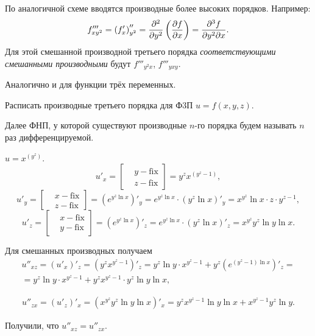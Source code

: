 \documentclass[../../main.tex]{subfiles}
\begin{document}
	По аналогичной схеме вводятся производные более высоких порядков. 
	Например:
	\[f'''_{xy^2} = \left(f'_x\right)''_{y^2} =
	 \frac{\partial ^2}{\partial y^2}\left(\frac{\partial f}{\partial x}\right) = 
	 \frac{\partial ^3f}{\partial y^2\partial x}.\]
	Для этой смешанной производной третьего порядка 
	\emph{соответствующими смешанными производными} будут $f'''_{y^2x}$, 
	$f'''_{yxy}$.
	
	Аналогично и для функции трёх переменных.
	
	\begin{exc}
		Расписать производные третьего порядка для Ф3П $u=f(x,y,z)$.
	\end{exc}

	Далее ФНП, у которой существуют производные $n$-го порядка будем 
	называть $n$ раз дифференцируемой.
	
	\begin{exmp}
		$u = x^{\left(y^z\right)}$.
		\[u'_x = \left[\begin{aligned}
			& y - \text{fix}\\
			& z - \text{fix}
		\end{aligned}\right] = y^zx^{\left(y^z - 1\right)},\]
		\[u'_y = \left[\begin{aligned}
			& x - \text{fix}\\
			& z - \text{fix}
		\end{aligned}\right] = \left(e^{y^z\ln x}\right)'_y = 
		e^{y^z\ln x}\cdot\left(y^z\ln x\right)'_y = x^{y^z}\ln x\cdot 
		z\cdot y^{z-1},\]
		\[u'_z = \left[\begin{aligned}
			& x - \text{fix}\\
			& y - \text{fix} 
		\end{aligned}\right] = \left(e^{y^z\ln x}\right)'_z = 
		e^{y^z\ln x}\cdot\left(y^z\ln x\right)'_z = x^{y^z}y^z\ln y\ln x.\]
		
		Для смешанных производных получаем
		\begin{gather*}
			u''_{xz} = \left(u'_x\right)'_z = 
			\left(y^zx^{y^z - 1}\right)'_z = 
			y^z\ln y\cdot x^{y^z - 1} + 
			y^{z}\left(e^{(y^z - 1)\ln x}\right)'_z =\\
			= y^z\ln y\cdot x^{y^z - 1} + y^zx^{y^z - 1}\cdot y^z\ln y\ln x,
		\end{gather*}
		
		\begin{gather*}
			u''_{zx} = \left(u'_z\right)'_x =
			 \left(x^{y^z}y^z\ln y\ln x\right)'_x
			 = y^zx^{y^z - 1}\ln y\ln x + x^{y^z - 1}y^z\ln y.
		\end{gather*}
		
		Получили, что $u''_{xz}=u''_{zx}$.
	\end{exmp}
\end{document}
